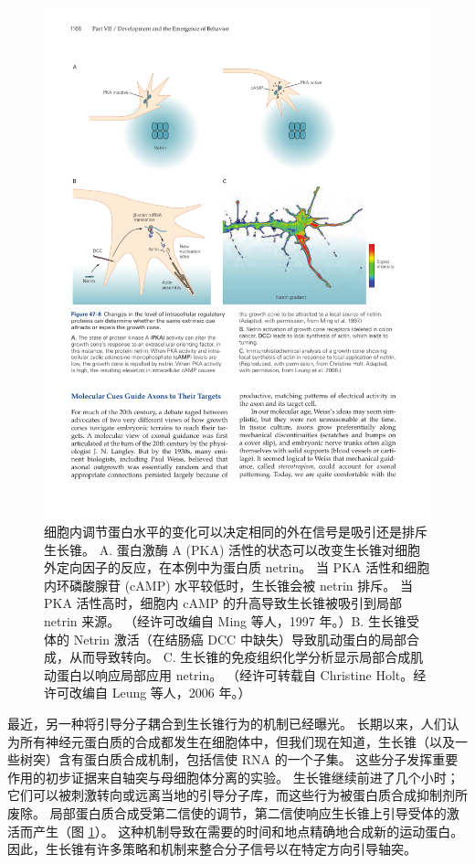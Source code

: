 \begin{figure}[htbp]
	\centering
	\includegraphics[width=0.9\linewidth]{chap47/fig_47_8}
	\caption{细胞内调节蛋白水平的变化可以决定相同的外在信号是吸引还是排斥生长锥。 A. 蛋白激酶 A (PKA) 活性的状态可以改变生长锥对细胞外定向因子的反应，在本例中为蛋白质 netrin。 当 PKA 活性和细胞内环磷酸腺苷 (cAMP) 水平较低时，生长锥会被 netrin 排斥。 当 PKA 活性高时，细胞内 cAMP 的升高导致生长锥被吸引到局部 netrin 来源。 （经许可改编自 Ming 等人，1997 年。）B. 生长锥受体的 Netrin 激活（在结肠癌 DCC 中缺失）导致肌动蛋白的局部合成，从而导致转向。 C. 生长锥的免疫组织化学分析显示局部合成肌动蛋白以响应局部应用 netrin。 （经许可转载自 Christine Holt。经许可改编自 Leung 等人，2006 年。）}
	\label{fig:47_8}
\end{figure}

最近，另一种将引导分子耦合到生长锥行为的机制已经曝光。 长期以来，人们认为所有神经元蛋白质的合成都发生在细胞体中，但我们现在知道，生长锥（以及一些树突）含有蛋白质合成机制，包括信使 RNA 的一个子集。 这些分子发挥重要作用的初步证据来自轴突与母细胞体分离的实验。 生长锥继续前进了几个小时； 它们可以被刺激转向或远离当地的引导分子库，而这些行为被蛋白质合成抑制剂所废除。 局部蛋白质合成受第二信使的调节，第二信使响应生长锥上引导受体的激活而产生（图 \ref{fig:47_8}）。 这种机制导致在需要的时间和地点精确地合成新的运动蛋白。 因此，生长锥有许多策略和机制来整合分子信号以在特定方向引导轴突。


